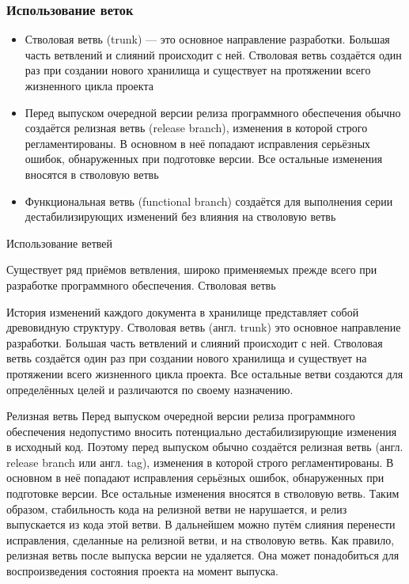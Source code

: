\documentclass{../industrial-development}
\begin{document}
\begin{frame} \frametitle{Использование веток}
  \begin{itemize}
  \item Стволовая ветвь (trunk) --- это основное направление разработки. Большая часть ветвлений и слияний происходит с ней. Стволовая ветвь создаётся один раз при создании нового хранилища и существует на протяжении всего жизненного цикла проекта
  \item Перед выпуском очередной версии релиза программного обеспечения обычно создаётся релизная ветвь (release branch), изменения в которой строго регламентированы. В основном в неё попадают исправления серьёзных ошибок, обнаруженных при подготовке версии. Все остальные изменения вносятся в стволовую ветвь
  \item Функциональная ветвь (functional branch) создаётся для выполнения серии дестабилизирующих изменений без влияния на стволовую ветвь
  \end{itemize}
\end{frame}

\lecturenotes

Использование ветвей

Существует ряд приёмов ветвления, широко применяемых прежде всего при разработке программного обеспечения.
Стволовая ветвь

История изменений каждого документа в хранилище представляет собой древовидную структуру. Стволовая ветвь (англ. trunk) это основное направление разработки. Большая часть ветвлений и слияний происходит с ней. Стволовая ветвь создаётся один раз при создании нового хранилища и существует на протяжении всего жизненного цикла проекта. Все остальные ветви создаются для определённых целей и различаются по своему назначению.

Релизная ветвь
Перед выпуском очередной версии релиза программного обеспечения недопустимо вносить потенциально дестабилизирующие изменения в исходный код. Поэтому перед выпуском обычно создаётся релизная ветвь (англ. release branch или англ. tag), изменения в которой строго регламентированы. В основном в неё попадают исправления серьёзных ошибок, обнаруженных при подготовке версии. Все остальные изменения вносятся в стволовую ветвь. Таким образом, стабильность кода на релизной ветви не нарушается, и релиз выпускается из кода этой ветви. В дальнейшем можно путём слияния перенести исправления, сделанные на релизной ветви, и на стволовую ветвь. Как правило, релизная ветвь после выпуска версии не удаляется. Она может понадобиться для воспроизведения состояния проекта на момент выпуска.
\end{document}
